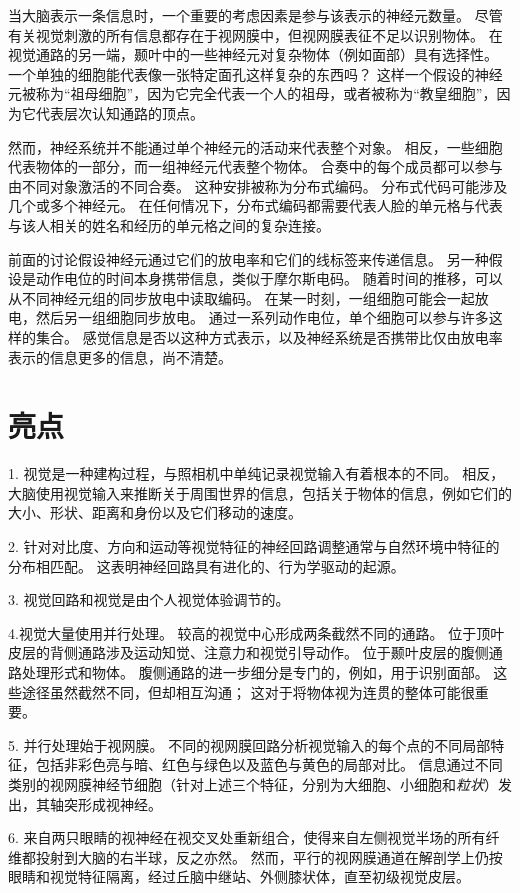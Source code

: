 当大脑表示一条信息时，一个重要的考虑因素是参与该表示的神经元数量。
尽管有关视觉刺激的所有信息都存在于视网膜中，但视网膜表征不足以识别物体。
在视觉通路的另一端，颞叶中的一些神经元对复杂物体（例如面部）具有选择性。
一个单独的细胞能代表像一张特定面孔这样复杂的东西吗？
这样一个假设的神经元被称为“祖母细胞”，因为它完全代表一个人的祖母，或者被称为“教皇细胞”，因为它代表层次认知通路的顶点。


然而，神经系统并不能通过单个神经元的活动来代表整个对象。
相反，一些细胞代表物体的一部分，而一组神经元代表整个物体。
合奏中的每个成员都可以参与由不同对象激活的不同合奏。
这种安排被称为分布式编码。
分布式代码可能涉及几个或多个神经元。
在任何情况下，分布式编码都需要代表人脸的单元格与代表与该人相关的姓名和经历的单元格之间的复杂连接。


前面的讨论假设神经元通过它们的放电率和它们的线标签来传递信息。
另一种假设是动作电位的时间本身携带信息，类似于摩尔斯电码。
随着时间的推移，可以从不同神经元组的同步放电中读取编码。
在某一时刻，一组细胞可能会一起放电，然后另一组细胞同步放电。
通过一系列动作电位，单个细胞可以参与许多这样的集合。
感觉信息是否以这种方式表示，以及神经系统是否携带比仅由放电率表示的信息更多的信息，尚不清楚。



\section{亮点}

1. 视觉是一种建构过程，与照相机中单纯记录视觉输入有着根本的不同。
相反，大脑使用视觉输入来推断关于周围世界的信息，包括关于物体的信息，例如它们的大小、形状、距离和身份以及它们移动的速度。


2. 针对对比度、方向和运动等视觉特征的神经回路调整通常与自然环境中特征的分布相匹配。
这表明神经回路具有进化的、行为学驱动的起源。


3. 视觉回路和视觉是由个人视觉体验调节的。


4.视觉大量使用并行处理。
较高的视觉中心形成两条截然不同的通路。
位于顶叶皮层的背侧通路涉及运动知觉、注意力和视觉引导动作。
位于颞叶皮层的腹侧通路处理形式和物体。
腹侧通路的进一步细分是专门的，例如，用于识别面部。 
这些途径虽然截然不同，但却相互沟通；
这对于将物体视为连贯的整体可能很重要。
 

5. 并行处理始于视网膜。
不同的视网膜回路分析视觉输入的每个点的不同局部特征，包括非彩色亮与暗、红色与绿色以及蓝色与黄色的局部对比。
信息通过不同类别的视网膜神经节细胞（针对上述三个特征，分别为大细胞、小细胞和\textit{粒状}）发出，其轴突形成视神经。
 

6. 来自两只眼睛的视神经在视交叉处重新组合，使得来自左侧视觉半场的所有纤维都投射到大脑的右半球，反之亦然。
然而，平行的视网膜通道在解剖学上仍按眼睛和视觉特征隔离，经过丘脑中继站、外侧膝状体，直至初级视觉皮层。 


